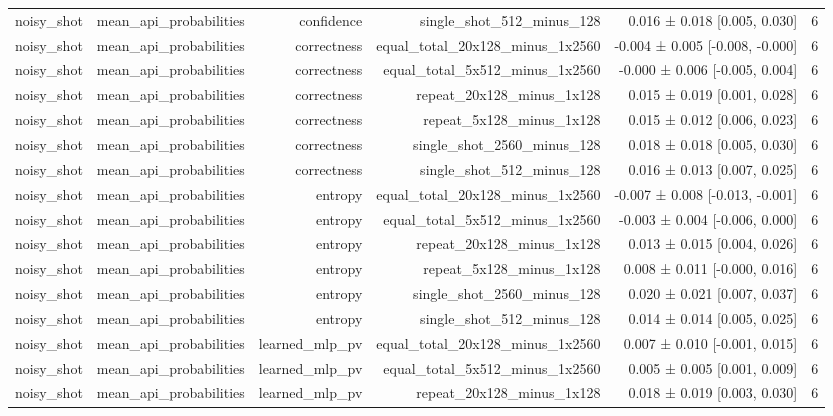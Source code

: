 \begin{table}
\begin{tabular}{lrrrrr}
noisy\_shot & mean\_api\_probabilities & confidence & single\_shot\_512\_minus\_128 & 0.016 ± 0.018 [0.005, 0.030] & 6 \\
noisy\_shot & mean\_api\_probabilities & correctness & equal\_total\_20x128\_minus\_1x2560 & -0.004 ± 0.005 [-0.008, -0.000] & 6 \\
noisy\_shot & mean\_api\_probabilities & correctness & equal\_total\_5x512\_minus\_1x2560 & -0.000 ± 0.006 [-0.005, 0.004] & 6 \\
noisy\_shot & mean\_api\_probabilities & correctness & repeat\_20x128\_minus\_1x128 & 0.015 ± 0.019 [0.001, 0.028] & 6 \\
noisy\_shot & mean\_api\_probabilities & correctness & repeat\_5x128\_minus\_1x128 & 0.015 ± 0.012 [0.006, 0.023] & 6 \\
noisy\_shot & mean\_api\_probabilities & correctness & single\_shot\_2560\_minus\_128 & 0.018 ± 0.018 [0.005, 0.030] & 6 \\
noisy\_shot & mean\_api\_probabilities & correctness & single\_shot\_512\_minus\_128 & 0.016 ± 0.013 [0.007, 0.025] & 6 \\
noisy\_shot & mean\_api\_probabilities & entropy & equal\_total\_20x128\_minus\_1x2560 & -0.007 ± 0.008 [-0.013, -0.001] & 6 \\
noisy\_shot & mean\_api\_probabilities & entropy & equal\_total\_5x512\_minus\_1x2560 & -0.003 ± 0.004 [-0.006, 0.000] & 6 \\
noisy\_shot & mean\_api\_probabilities & entropy & repeat\_20x128\_minus\_1x128 & 0.013 ± 0.015 [0.004, 0.026] & 6 \\
noisy\_shot & mean\_api\_probabilities & entropy & repeat\_5x128\_minus\_1x128 & 0.008 ± 0.011 [-0.000, 0.016] & 6 \\
noisy\_shot & mean\_api\_probabilities & entropy & single\_shot\_2560\_minus\_128 & 0.020 ± 0.021 [0.007, 0.037] & 6 \\
noisy\_shot & mean\_api\_probabilities & entropy & single\_shot\_512\_minus\_128 & 0.014 ± 0.014 [0.005, 0.025] & 6 \\
noisy\_shot & mean\_api\_probabilities & learned\_mlp\_pv & equal\_total\_20x128\_minus\_1x2560 & 0.007 ± 0.010 [-0.001, 0.015] & 6 \\
noisy\_shot & mean\_api\_probabilities & learned\_mlp\_pv & equal\_total\_5x512\_minus\_1x2560 & 0.005 ± 0.005 [0.001, 0.009] & 6 \\
noisy\_shot & mean\_api\_probabilities & learned\_mlp\_pv & repeat\_20x128\_minus\_1x128 & 0.018 ± 0.019 [0.003, 0.030] & 6 \\

\end{tabular}
\end{table}

